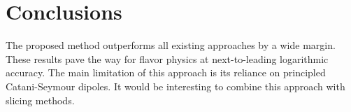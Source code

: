 \section{Conclusions}\label{sec:conclusions}

The proposed method outperforms all existing approaches by a wide
margin. These results pave the way for flavor physics at next-to-leading
logarithmic accuracy. The main limitation of this approach is its
reliance on principled Catani-Seymour dipoles. It would be interesting
to combine this approach with slicing methods.


